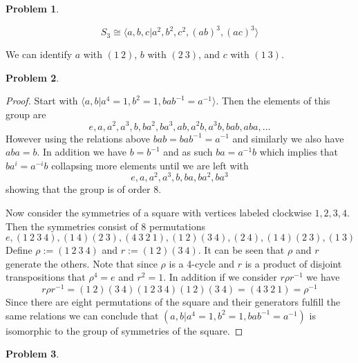\documentclass[10pt]{article}
\newcommand{\sk}{\vskip 10mm}
\theoremstyle{plain}
\newtheorem{problem}{Problem}
\theoremstyle{remark}
\begin{document}
\begin{problem} %
  
\end{problem}

\[S_3 \cong \langle a,b,c | a^2,b^2,c^2,(ab)^3,(ac)^3 \rangle\]

We can identify $a$ with $(1\ 2)$, $b$ with $(2\ 3)$, and
$c$ with $(1\ 3)$.

\sk

\begin{problem} %
  
\end{problem}

\begin{proof}
  Start with $\langle a,b| a^4=1,b^2=1,bab^{-1}=a^{-1}\rangle$. Then the elements of this group
  are
  \[ e,a,a^2,a^3,b,ba^2,ba^3,ab,a^2b,a^3b,bab,aba,\ldots \]
  However using the relations above $bab=bab^{-1}=a^{-1}$ and similarly
  we also have $aba=b$. In addition we have $b=b^{-1}$ and as such $ba=a^{-1}b$
  which implies that $ba^i=a^{-i}b$ collapsing more elements until we are left with
  \[ e,a,a^2,a^3,b,ba,ba^2,ba^3 \]
  showing that the group is of order 8.

  Now consider the symmetries of a square with vertices labeled clockwise $1,2,3,4$.
  Then the symmetries consist of 8 permutations
  \[ e,(1\ 2\ 3\ 4),(1\ 4)(2\ 3),(4\ 3\ 2\ 1),(1\ 2)(3\ 4),(2\ 4),(1\ 4)(2\ 3),(1\ 3)\]
  Define $\rho:=(1\ 2\ 3\ 4)$ and $r:=(1\ 2)(3\ 4)$. It can be seen that $\rho$ and $r$
  generate the others. Note that since $\rho$ is a 4-cycle and
  $r$ is a product of disjoint transpositions that $\rho^4=e$ and $r^2=1$.
  In addition if we consider $r\rho r^{-1}$ we have
  \[ r\rho r^{-1}=(1\ 2)(3\ 4)(1\ 2\ 3\ 4)(1\ 2)(3\ 4)=(4\ 3\ 2\ 1)=\rho^{-1}\]
  Since there are eight permutations of the square and their generators fulfill the
  same relations we can conclude that
  $( a,b| a^4=1,b^2=1,bab^{-1}=a^{-1})$ is isomorphic to the group of symmetries of the
  square.
\end{proof}

\sk

\begin{problem} %
  
\end{problem}
\end{document}
